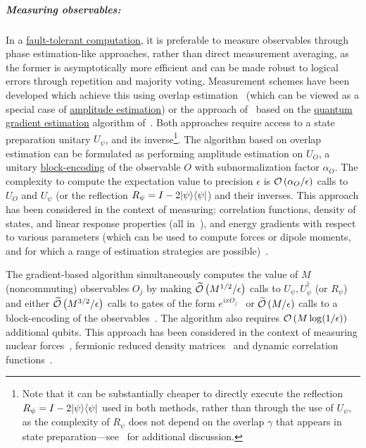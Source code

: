 \begin{refsection}
\subparagraph{Measuring observables:}
In a \hyperref[prim:FTQC]{fault-tolerant computation}, it is preferable to measure observables through phase estimation-like approaches, rather than direct measurement averaging, as the former is asymptotically more efficient and can be made robust to logical errors through repetition and majority voting. Measurement schemes have been developed which achieve this using overlap estimation~\cite{knill2007ObservableMeasurement} (which can be viewed as a special case of \hyperref[prim:AmpEst]{amplitude estimation}) or the approach of~\cite{huggins2022ExpectationValue,apeldoorn2022TomographyStatePreparationUnitaries} based on the \hyperref[prim:GradientEstimation]{quantum gradient estimation} algorithm of~\cite{gilyen2017OptQOptAlgGrad}. Both approaches require access to a state preparation unitary $U_\psi$, and its inverse\footnote{Note that it can be substantially cheaper to directly execute the reflection $R_\psi = I - 2 \lvert\psi\rangle\langle\psi\rvert$ used in both methods, rather than through the use of $U_\psi$, as the complexity of $R_\psi$ does not depend on the overlap $\gamma$ that appears in state preparation---see~\cite{lin2020NearOptimalGroundState} for additional discussion.}. The algorithm based on overlap estimation can be formulated as performing amplitude estimation on $U_O$, a unitary \hyperref[prim:BlockEncodings]{block-encoding} of the observable $O$ with subnormalization factor $\alpha_O$. The complexity to compute the expectation value to precision $\epsilon$ is $\mathcal{O}\left( \alpha_O/\epsilon \right)$ calls to $U_O$ and $U_\psi$ (or the reflection $R_\psi = I - 2 \lvert\psi\rangle\langle\psi\rvert$) and their inverses. This approach has been considered in the context of measuring: correlation functions, density of states, and linear response properties (all in~\cite{rall2020EstimatingPhysicalQuantities}), and energy gradients with respect to various parameters (which can be used to compute forces or dipole moments, and for which a range of estimation strategies are possible)~\cite{obrien2022MolecularForces,steudtner2023MolecularObservables}.  

The gradient-based algorithm simultaneously computes the value of $M$ (noncommuting) observables $O_j$ by making $\widetilde{\mathcal{O}}\left( M^{1/2}/\epsilon \right)$ calls to $U_\psi, U_\psi^\dag$ (or $R_\psi$) and either $\widetilde{\mathcal{O}}\left( M^{3/2}/\epsilon \right)$ calls to gates of the form $e^{i x O_j}$~\cite{huggins2022ExpectationValue} or $\widetilde{\mathcal{O}}\left( M/\epsilon \right)$ calls to a block-encoding of the observables~\cite{apeldoorn2022TomographyStatePreparationUnitaries}. The algorithm also requires $\mathcal{O}\left( M \log(1/\epsilon)  \right)$ additional qubits. This approach has been considered in the context of measuring nuclear forces~\cite{obrien2022MolecularForces}, fermionic reduced density matrices~\cite{huggins2022ExpectationValue} and dynamic correlation functions~\cite{huggins2022ExpectationValue}.








\end{refsection}
